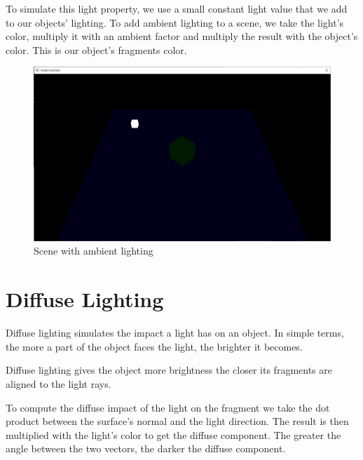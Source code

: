 To simulate this light property, we use a small constant light value that we
add to our objects' lighting.
To add ambient lighting to a scene, we take the light's color, multiply it with
an ambient factor and multiply the result with the object's color.
This is our object's fragments color.

\begin{minipage}{\linewidth}{\noindent}
    
\end{minipage}

\begin{figure}[ht]
    \centering
    \includegraphics[scale=0.25]{images/ChBlinnPhong/SceneAmbient.png}
    \caption{Scene with ambient lighting}
    \label{fig::SceneAmbient}
\end{figure}

\section{Diffuse Lighting}

Diffuse lighting simulates the impact a light has on an object.
In simple terms, the more a part of the object faces the light, the brighter
it becomes.

Diffuse lighting gives the object more brightness the closer its fragments
are aligned to the light rays.

To compute the diffuse impact of the light on the fragment we take the dot
product between the surface's normal and the light direction.
The result is then multiplied with the light's color to get the diffuse component.
The greater the angle between the two vectors, the darker the diffuse component.

